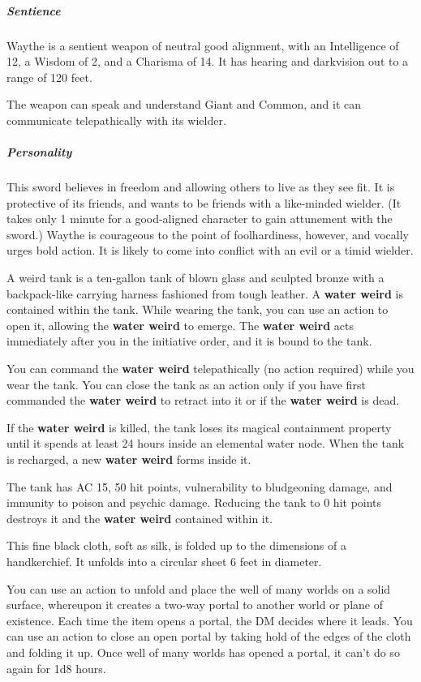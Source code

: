 \documentclass[10pt,a4paper,twoside,bg=print,twocolumn,openany,nodeprecatedcode]{dndbook}
\begin{document}
\subparagraph{Sentience}
Waythe is a sentient weapon of neutral good alignment, with an Intelligence of 12, a Wisdom of 2, and a Charisma of 14. It has hearing and darkvision out to a range of 120 feet.

The weapon can speak and understand Giant and Common, and it can communicate telepathically with its wielder.

\subparagraph{Personality}
This sword believes in freedom and allowing others to live as they see fit. It is protective of its friends, and wants to be friends with a like-minded wielder. (It takes only 1 minute for a good-aligned character to gain attunement with the sword.) Waythe is courageous to the point of foolhardiness, however, and vocally urges bold action. It is likely to come into conflict with an evil or a timid wielder.

A weird tank is a ten-gallon tank of blown glass and sculpted bronze with a backpack-like carrying harness fashioned from tough leather. A \textbf{water weird} is contained within the tank. While wearing the tank, you can use an action to open it, allowing the \textbf{water weird} to emerge. The \textbf{water weird} acts immediately after you in the initiative order, and it is bound to the tank.

You can command the \textbf{water weird} telepathically (no action required) while you wear the tank. You can close the tank as an action only if you have first commanded the \textbf{water weird} to retract into it or if the \textbf{water weird} is dead.

If the \textbf{water weird} is killed, the tank loses its magical containment property until it spends at least 24 hours inside an elemental water node. When the tank is recharged, a new \textbf{water weird} forms inside it.

The tank has AC 15, 50 hit points, vulnerability to bludgeoning damage, and immunity to poison and psychic damage. Reducing the tank to 0 hit points destroys it and the \textbf{water weird} contained within it.

This fine black cloth, soft as silk, is folded up to the dimensions of a handkerchief. It unfolds into a circular sheet 6 feet in diameter.

You can use an action to unfold and place the well of many worlds on a solid surface, whereupon it creates a two-way portal to another world or plane of existence. Each time the item opens a portal, the DM decides where it leads. You can use an action to close an open portal by taking hold of the edges of the cloth and folding it up. Once well of many worlds has opened a portal, it can't do so again for 1d8 hours.
\end{document}
